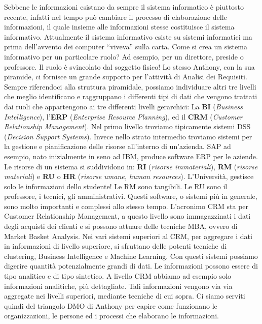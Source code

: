 Sebbene le informazioni esistano da sempre il sistema informatico è piuttosto recente, infatti nel tempo può cambiare il processo di elaborazione delle informazioni, il quale insieme alle informazioni stesse costituisce il sistema informativo. Attualmente il sistema informativo esiste su sistemi informatici ma prima dell’avvento dei computer “viveva” sulla carta.  
Come si crea un sistema informativo per un particolare ruolo? Ad esempio, per un direttore, preside o professore. Il ruolo è svincolato dal soggetto fisico! Lo stesso Anthony, con la sua piramide, ci fornisce un grande supporto per l'attività di Analisi dei Requisiti. Sempre riferendoci alla struttura piramidale, possiamo individuare altri tre livelli che meglio identificano e raggruppano i differenti tipi di dati che vengono trattati dai ruoli che appartengono ai tre differenti livelli gerarchici: La \textbf {BI} (\textit{Business Intelligence}), l'\textbf{ERP} (\textit{Enterprise Resource Planning}), ed il \textbf{CRM} (\textit{Customer Relationship Management}). Nel primo livello troviamo tipicamente sistemi DSS (\textit{Decision Support Systems}). Invece nello strato intermedio troviamo sistemi per la gestione e pianificazione delle risorse all'interno di un'azienda. SAP ad esempio, nato inizialmente in seno ad IBM, produce software ERP per le aziende.  
Le risorse di un sistema si suddividono in: \textbf{RI} (\textit{risorse immateriali}), \textbf{RM} (\textit{risorse materiali}) e \textbf{RU} o \textbf{HR} (\textit{risorse umane, human resources}). L'Università, gestisce solo le informazioni dello studente! Le RM sono tangibili. Le RU sono il professore, i tecnici, gli amministrativi. Questi software, o sistemi più in generale, sono molto importanti e complessi allo stesso tempo. L’acronimo CRM sta per Customer Relationship Management, a questo livello sono immagazzinati i dati degli acquisti dei clienti e si possono attuare delle tecniche MBA, ovvero di Market Basket Analysis. Nei vari sistemi superiori al CRM, per aggregare i dati in informazioni di livello superiore, si sfruttano delle potenti tecniche di clustering, Business Intelligence e Machine Learning. Con questi sistemi possiamo digerire quantità potenzialmente grandi di dati. Le informazioni possono essere di tipo analitico e di tipo sintetico. A livello CRM abbiamo ad esempio solo informazioni analitiche, più dettagliate. Tali informazioni vengono via via aggregate nei livelli superiori, mediante tecniche di cui sopra. Ci siamo serviti quindi del triangolo DMO di Anthony per capire come funzionano le organizzazioni, le persone ed i processi che elaborano le informazioni. 
 
